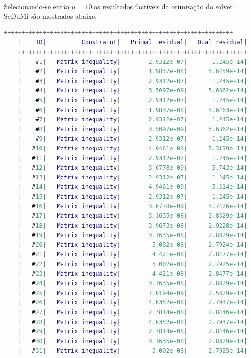 \documentclass[a4paper,10pt]{article}
\begin{document}
\paragraph{}Selecionando-se então $\mu=10$ os resultados factíveis da otimização do solver SeDuMi são mostrados abaixo.
\begin{lstlisting}[language=Matlab]
	+++++++++++++++++++++++++++++++++++++++++++++++++++++++++++++++++
	|    ID|          Constraint|   Primal residual|   Dual residual|
	+++++++++++++++++++++++++++++++++++++++++++++++++++++++++++++++++
	|    #1|   Matrix inequality|        2.9312e-07|       1.245e-14|
	|    #2|   Matrix inequality|        1.9837e-08|      5.6459e-14|
	|    #3|   Matrix inequality|        2.9312e-07|       1.245e-14|
	|    #4|   Matrix inequality|        3.5097e-09|      5.6862e-14|
	|    #5|   Matrix inequality|        2.9312e-07|       1.245e-14|
	|    #6|   Matrix inequality|        1.9837e-08|      5.6463e-14|
	|    #7|   Matrix inequality|        2.9312e-07|       1.245e-14|
	|    #8|   Matrix inequality|        3.5097e-09|      5.6862e-14|
	|    #9|   Matrix inequality|        2.9312e-07|       1.245e-14|
	|   #10|   Matrix inequality|        4.9461e-09|      5.3139e-14|
	|   #11|   Matrix inequality|        2.9312e-07|       1.245e-14|
	|   #12|   Matrix inequality|        3.6778e-09|       5.743e-14|
	|   #13|   Matrix inequality|        2.9312e-07|       1.245e-14|
	|   #14|   Matrix inequality|        4.9461e-09|       5.314e-14|
	|   #15|   Matrix inequality|        2.9312e-07|       1.245e-14|
	|   #16|   Matrix inequality|        3.6778e-09|      5.7426e-14|
	|   #17|   Matrix inequality|        3.1635e-08|      2.8329e-14|
	|   #18|   Matrix inequality|        3.9673e-08|      2.9228e-14|
	|   #19|   Matrix inequality|        3.1635e-08|      2.8329e-14|
	|   #20|   Matrix inequality|         5.002e-08|      2.7924e-14|
	|   #21|   Matrix inequality|         4.421e-08|      2.8477e-14|
	|   #22|   Matrix inequality|         5.002e-08|      2.7925e-14|
	|   #23|   Matrix inequality|         4.421e-08|      2.8477e-14|
	|   #24|   Matrix inequality|        3.1635e-08|      2.8329e-14|
	|   #25|   Matrix inequality|        7.0194e-09|      2.5329e-14|
	|   #26|   Matrix inequality|        4.6352e-08|      2.7937e-14|
	|   #27|   Matrix inequality|        2.7814e-08|      2.8446e-14|
	|   #28|   Matrix inequality|        4.6352e-08|      2.7937e-14|
	|   #29|   Matrix inequality|        2.7814e-08|      2.8446e-14|
	|   #30|   Matrix inequality|        3.1635e-08|      2.8329e-14|
	|   #31|   Matrix inequality|         5.002e-08|      2.7925e-14|

\end{lstlisting}
\end{document}
